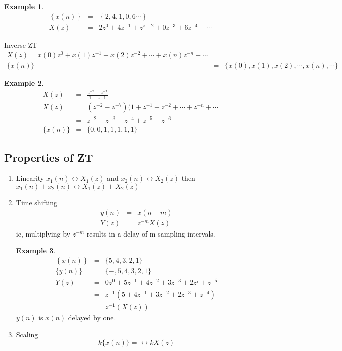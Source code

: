 \documentclass[11pt]{article} %
\theoremstyle{definition}
\newtheorem{example}{Example}[subsection]
\begin{document}
\begin{example}
	\begin{eqnarray}
		\left\{x(n)\right\} &=& \left\{2, 4, 1, 0, 6 \cdots \right\} \nonumber \\
		X(z) &=&  2 z^0+4z^{-1} + z^{z-2}+0z^{-3}+6z^{-4}+\cdots
	\end{eqnarray}
\end{example}
Inverse ZT
\begin{eqnarray}
	X(z)= x(0)z^0+x(1)z^{-1}+x(2)z^{-2}+\cdots+x(n)z^{-n} + \cdots \nonumber \\
	\{x(n)\}&=&\{x(0), x(1), x(2), \cdots, x(n), \cdots \}
\end{eqnarray}
\begin{example}
	\begin{eqnarray}
		X(z) &=& \frac{z^{-2}-z^{-7}}{1-z{-1}} \\
		X(z) &=& (z^{-2}-z^{-7})(1+z^{-1}+z^{-2}+\cdots+z^{-n} + \cdots\nonumber \\
		&=& z^{-2}+z^{-3}+z^{-4}+z^{-5}+z^{-6} \nonumber \\
		\{x(n)\}&=&\{0,0,1,1,1,1,1\}
\end{eqnarray}
\end{example}

\subsection{Properties of ZT}
\begin{enumerate}
\item Linearity
${x_1(n)}\leftrightarrow X_1(z)$ and ${x_2(n)}\leftrightarrow X_2(z)$ then ${x_1(n)}+{x_2(n)}\leftrightarrow X_1(z)+X_2(z)$
\item
Time shifting
\begin{eqnarray}
{y(n)}&=&{x(n-m)}\nonumber \\
Y(z) &=& z^{-m}X(z)
\end{eqnarray}
ie, multiplying by $z^{-m}$ results in a delay of m sampling intervals.

\begin{example}
	\begin{eqnarray}
		\left\{x(n)\right\} &=& \{5,4,3,2,1\} \nonumber \\
		\{y(n)\} &=& \{-,5,4,3,2,1\} \nonumber \\
		Y(z) &=& 0z^0+5z^{-1}+4z^{-2}+3z^{-3}+2z^{_4}+z^{-5} \nonumber \\
		&=& z^{-1}(5+4z^{-1}+3z^{-2}+2z^{-3}+z^{-4}) \nonumber \\
		&=& z^{-1}(X(z))
\end{eqnarray}
$y(n)$ is $x(n)$ delayed by one.
\end{example}
\item Scaling
\begin{equation}
k\{x(n)\}=\leftrightarrow kX(z)
\end{equation}
\end{enumerate}
\end{document}

